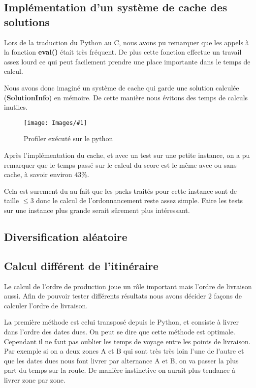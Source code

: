 \documentclass[hideweeklyreports]{polytech/polytech}
\newcommand{\img}[3]{%
	\begin{figure}[H]
		\centering
   		\texttt{[image: Images/\#1]}
  	 	\caption{#2}
	\end{figure}
}
\begin{document}
			\subsection{\label{cache}Implémentation d'un système de cache des solutions}
				Lors de la traduction du Python au C, nous avons pu remarquer que les appels à la fonction \textbf{eval()} était très fréquent. De plus cette fonction effectue un travail assez lourd ce qui peut facilement prendre une place importante dans le temps de calcul.
				
				Nous avons donc imaginé un système de cache qui garde une solution calculée (\textbf{SolutionInfo}) en mémoire. De cette manière nous évitons des temps de calculs inutiles.
				
				\img{PythonProfilerTop.png}{Profiler exécuté sur le python}{0.3}
				
				Après l'implémentation du cache, et avec un test sur une petite instance, on a pu remarquer que le temps passé sur le calcul du score est le même avec ou sans cache, à savoir environ $43\%$.
				
				Cela est surement du au fait que les packs traités pour cette instance sont de taille $\leq 3$ donc le calcul de l'ordonnancement reste assez simple. Faire les tests sur une instance plus grande serait sûrement plus intéressant. %
			
			\subsection{Diversification aléatoire} %
			\subsection{Calcul différent de l'itinéraire}
				Le calcul de l'ordre de production joue un rôle important mais l'ordre de livraison aussi. Afin de pouvoir tester différents résultats nous avons décider 2 façons de calculer l'ordre de livraison.
				
				La première méthode est celui transposé depuis le Python, et consiste à livrer dans l'ordre des dates dues. On peut se dire que cette méthode est optimale. Cependant il ne faut pas oublier les temps de voyage entre les points de livraison. Par exemple si on a deux zones A et B qui sont très très loin l'une de l'autre et que les dates dues nous font livrer par alternance A et B, on va passer la plus part du temps sur la route. De manière instinctive on aurait plus tendance à livrer zone par zone.
				
\end{document}
